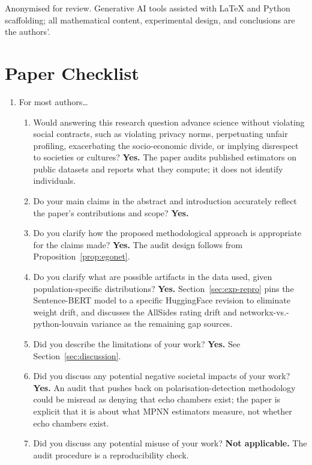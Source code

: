 \documentclass[letterpaper]{article} %
\begin{document}
Anonymised for review. Generative AI tools assisted with LaTeX
and Python scaffolding; all mathematical content, experimental
design, and conclusions are the authors'.



\section*{Paper Checklist}
\begin{enumerate}
\item For most authors\ldots
  \begin{enumerate}
  \item Would answering this research question advance science
    without violating social contracts, such as violating privacy
    norms, perpetuating unfair profiling, exacerbating the
    socio-economic divide, or implying disrespect to societies or
    cultures? \textbf{Yes.} The paper audits published estimators
    on public datasets and reports what they compute; it does not
    identify individuals.
  \item Do your main claims in the abstract and introduction
    accurately reflect the paper's contributions and scope?
    \textbf{Yes.}
  \item Do you clarify how the proposed methodological approach is
    appropriate for the claims made? \textbf{Yes.} The
    audit design follows from
    Proposition~\ref{prop:egonet}.
  \item Do you clarify what are possible artifacts in the data
    used, given population-specific distributions? \textbf{Yes.}
    Section~\ref{sec:exp-repro} pins the Sentence-BERT model to a
    specific HuggingFace revision to eliminate weight drift, and
    discusses the AllSides rating drift and networkx-vs.-python-louvain
    variance as the remaining gap sources.
  \item Did you describe the limitations of your work?
    \textbf{Yes.} See Section~\ref{sec:discussion}.
  \item Did you discuss any potential negative societal impacts
    of your work? \textbf{Yes.} An audit that pushes back on
    polarisation-detection methodology could be misread as
    denying that echo chambers exist; the paper is explicit that
    it is about what MPNN estimators measure, not whether echo
    chambers exist.
  \item Did you discuss any potential misuse of your work?
    \textbf{Not applicable.} The audit procedure is a
    reproducibility check.

\end{enumerate}
\end{enumerate}
\end{document}
